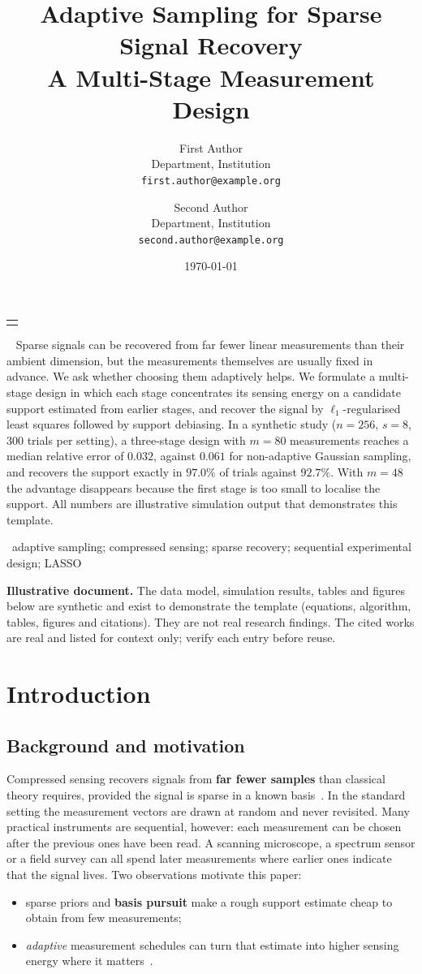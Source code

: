 \documentclass[11pt,a4paper]{article}
\title{Adaptive Sampling for Sparse Signal Recovery\\[0.4em]{\large\mdseries A Multi-Stage Measurement Design}}
\author{First Author\\{\small Department, Institution}\\{\small\texttt{first.author@example.org}}
  \and Second Author\\{\small Department, Institution}\\{\small\texttt{second.author@example.org}}}
\date{\today}
\makeatletter
\theoremstyle{definition}
\newcommand{\keywords}[1]{\par\smallskip\noindent{\lpHeadingFont\bfseries Keywords:}\ #1\par}
\newcommand{\illustrativenotice}[1]{\par\medskip\noindent\colorbox{lpTint}{\parbox{\dimexpr\linewidth-2\fboxsep\relax}{\small\color{lpMuted}#1}}\par\bigskip}
\renewcommand{\maketitle}{%
  \begin{center}
    {\lpHeadingFont\bfseries\LARGE\color{lpAccent}\@title\par}\vspace{1.2em}
    {\large\begin{tabular}[t]{c}\@author\end{tabular}\par}\vspace{0.8em}
    {\small\color{lpMuted}\@date\par}
  \end{center}\par\vspace{0.2em}}
\renewenvironment{abstract}{%
  \begin{list}{}{\setlength{\leftmargin}{1cm}\setlength{\rightmargin}{1cm}\setlength{\listparindent}{0pt}\setlength{\parsep}{0pt}}%
  \item\relax{\lpHeadingFont\bfseries\color{lpAccent}\abstractname.}\ \small}{\end{list}}
\makeatother
\begin{document}
\maketitle

\begin{abstract}
Sparse signals can be recovered from far fewer linear measurements than their ambient dimension, but the
measurements themselves are usually fixed in advance. We ask whether choosing them adaptively helps.
We formulate a multi-stage design in which each stage concentrates its sensing energy on a candidate support
estimated from earlier stages, and recover the signal by $\ell_1$-regularised least squares followed by
support debiasing. In a synthetic study ($n=256$, $s=8$, 300 trials per setting), a three-stage design with
$m=80$ measurements reaches a median relative error of $0.032$, against $0.061$ for non-adaptive Gaussian
sampling, and recovers the support exactly in $97.0\%$ of trials against $92.7\%$. With $m=48$ the advantage
disappears because the first stage is too small to localise the support. All numbers are illustrative simulation
output that demonstrates this template.
\keywords{adaptive sampling; compressed sensing; sparse recovery; sequential experimental design; LASSO}
\end{abstract}

\illustrativenotice{\textbf{Illustrative document.} The data model, simulation results, tables and figures below are
synthetic and exist to demonstrate the template (equations, algorithm, tables, figures and citations). They are not
real research findings. The cited works are real and listed for context only; verify each entry before reuse.}

\section{Introduction}\label{sec:intro}

\subsection{Background and motivation}\label{sec:background}
Compressed sensing recovers signals from \textbf{far fewer samples} than classical theory requires, provided the signal is
sparse in a known basis~\cite{candes2006,donoho2006,foucart2013}. In the standard setting the measurement vectors are drawn at random
and never revisited. Many practical instruments are sequential, however: each measurement can be chosen after the previous
ones have been read. A scanning microscope, a spectrum sensor or a field survey can all spend later measurements where
earlier ones indicate that the signal lives. Two observations motivate this paper:
\begin{itemize}
  \item sparse priors and \textbf{basis pursuit} make a rough support estimate cheap to obtain from few measurements;
  \item \textit{adaptive} measurement schedules can turn that estimate into higher sensing energy where it matters~\cite{haupt2011,ji2008}.
\end{itemize}
\end{document}
